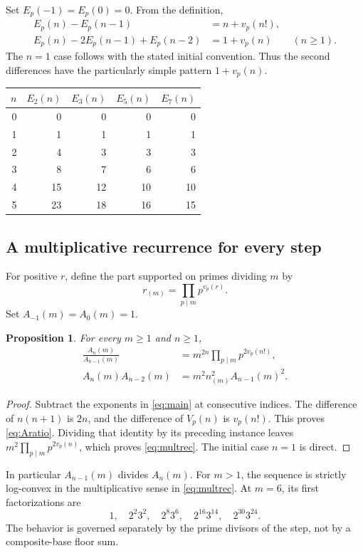 \documentclass[11pt,a4paper]{article}
\numberwithin{equation}{section}
\newtheorem{proposition}[theorem]{Proposition}
\theoremstyle{definition}
\theoremstyle{remark}
\begin{document}
Set $E_p(-1)=E_p(0)=0$. From the definition,
\begin{align}
 E_p(n)-E_p(n-1)&=n+v_p(n!),\label{eq:Epfirst}\\
 E_p(n)-2E_p(n-1)+E_p(n-2)&=1+v_p(n)\qquad(n\geq1).\label{eq:Epsecond}
\end{align}
The $n=1$ case follows with the stated initial convention. Thus the second differences have the particularly simple pattern $1+v_p(n)$.

\begin{center}
\begin{tabular}{r r r r r}
\toprule
$n$ & $E_2(n)$ & $E_3(n)$ & $E_5(n)$ & $E_7(n)$\\
\midrule
0&0&0&0&0\\
1&1&1&1&1\\
2&4&3&3&3\\
3&8&7&6&6\\
4&15&12&10&10\\
5&23&18&16&15\\
\bottomrule
\end{tabular}
\end{center}

\subsection{A multiplicative recurrence for every step}
For positive $r$, define the part supported on primes dividing $m$ by
\[
 r_{(m)}=\prod_{p\mid m}p^{v_p(r)}.
\]
Set $A_{-1}(m)=A_0(m)=1$.

\begin{proposition}\label{prop:multrec}
For every $m\geq1$ and $n\geq1$,
\begin{align}
 \frac{A_n(m)}{A_{n-1}(m)}
 &=m^{2n}\prod_{p\mid m}p^{2v_p(n!)},\label{eq:Aratio}\\
 A_n(m)A_{n-2}(m)
 &=m^2n_{(m)}^2 A_{n-1}(m)^2.\label{eq:multrec}
\end{align}
\end{proposition}
\begin{proof}
Subtract the exponents in \eqref{eq:main} at consecutive indices. The difference of $n(n+1)$ is $2n$, and the difference of $V_p(n)$ is $v_p(n!)$. This proves \eqref{eq:Aratio}. Dividing that identity by its preceding instance leaves $m^2\prod_{p\mid m}p^{2v_p(n)}$, which proves \eqref{eq:multrec}. The initial case $n=1$ is direct.
\end{proof}

In particular $A_{n-1}(m)$ divides $A_n(m)$. For $m>1$, the sequence is strictly log-convex in the multiplicative sense in \eqref{eq:multrec}. At $m=6$, its first factorizations are
\[
 1,\quad 2^2 3^2,\quad 2^8 3^6,\quad 2^{16}3^{14},\quad 2^{30}3^{24}.
\]
The behavior is governed separately by the prime divisors of the step, not by a composite-base floor sum.
\end{document}
